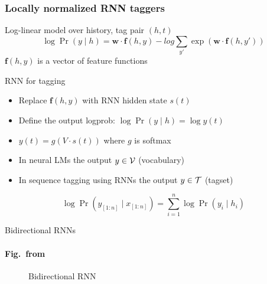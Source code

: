 \begin{frame}
\frametitle{Locally normalized RNN taggers}
\begin{block}{Log-linear model over history, tag pair $(h,t)$}
\[ \log \Pr(y \mid h) = \textbf{w} \cdot \textbf{f}(h, y) - log \sum_{y'} \exp \left( \textbf{w} \cdot \textbf{f}(h, y') \right) \]
\centering
$\textbf{f}(h, y)$ is a vector of feature functions
\end{block}
\pause
\begin{block}{RNN for tagging}
\begin{itemize}
\item Replace $\textbf{f}(h, y)$ with RNN hidden state $s(t)$
\item Define the output logprob: $\log \Pr(y \mid h) = \log y(t)$
\item $y(t) = g(V \cdot s(t))$ where $g$ is softmax
\item In neural LMs the output $y \in {\cal V}$ (vocabulary)
\item In sequence tagging using RNNs the output $y \in {\cal T}$ (tagset)
\end{itemize}
\[ \log \Pr( y_{[1:n]} \mid x_{[1:n]} ) = \sum_{i=1}^n \log \Pr(y_i \mid h_i) \]
\end{block}
\end{frame}

\begin{frame}{Bidirectional RNNs}
\framesubtitle{Fig.\ from \cite{Brakel2015}}
\begin{figure}[t]
\centering
{}
\caption{Bidirectional RNN}
\label{fig:birnn}
\end{figure}
\end{frame}

